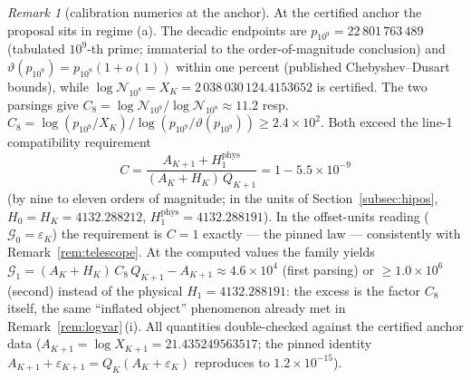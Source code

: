 \documentclass[11pt]{article}
\theoremstyle{remark}
\newtheorem{remark}[theorem]{Remark}
\newcommand{\eps}{\varepsilon}
\begin{document}
\begin{remark}[calibration numerics at the anchor]\label{rem:calibnum}
At the certified anchor the proposal sits in regime (a). The decadic
endpoints are $p_{10^{9}}=22\,801\,763\,489$ (tabulated $10^9$-th prime;
immaterial to the order-of-magnitude conclusion) and
$\vartheta(p_{10^{9}})=p_{10^9}(1+o(1))$ within one percent (published
Chebyshev--Dusart bounds), while $\log\mathcal N_{10^{8}}=X_K
=2\,038\,030\,124.4153652$ is certified. The two parsings give
$C_8=\log\mathcal N_{10^{9}}/\log\mathcal N_{10^{8}}\approx11.2$ resp.
$C_8=\log(p_{10^{9}}/X_K)/\log(p_{10^{9}}/\vartheta(p_{10^{9}}))\ge2.4\times10^{2}$.
Both exceed the line-1 compatibility requirement
\[
C=\frac{A_{K+1}+H_1^{\mathrm{phys}}}{(A_K+H_K)\,Q_{K+1}}
=1-5.5\times10^{-9}
\]
(by nine to eleven orders of magnitude; in the units of
Section~\ref{subsec:hipos}, $H_0=H_K=4132.288212$,
$H_1^{\mathrm{phys}}=4132.288191$). In the offset-units reading
($\mathcal G_0=\eps_K$) the requirement is $C=1$ exactly --- the pinned
law --- consistently with Remark~\ref{rem:telescope}. At the computed
values the family yields
$\mathcal G_1=(A_K+H_K)\,C_8\,Q_{K+1}-A_{K+1}\approx4.6\times10^{4}$
(first parsing) or $\ge1.0\times10^{6}$ (second) instead of the physical
$H_1=4132.288191$: the excess is the factor $C_8$ itself, the same
``inflated object'' phenomenon already met in
Remark~\ref{rem:logvar}\,(i). All quantities double-checked against the
certified anchor data ($A_{K+1}=\log X_{K+1}=21.435249563517$; the
pinned identity $A_{K+1}+\eps_{K+1}=Q_K(A_K+\eps_K)$ reproduces to
$1.2\times10^{-15}$).
\end{remark}
\end{document}
